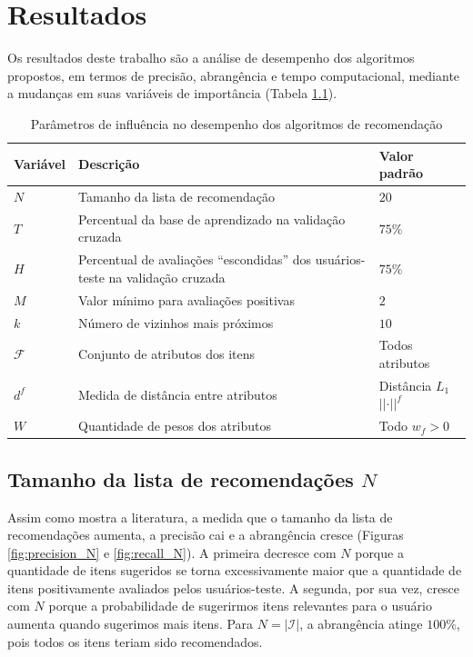\chapter[Resultados]{Resultados}
\label{chap:resultados}

Os resultados deste trabalho são a análise de desempenho dos algoritmos propostos, em termos de precisão, abrangência e tempo computacional, mediante a mudanças em suas variáveis de importância (Tabela \ref{tab:variaveis}).

\begin{table}[hp]
\begin{center}
    \caption{Parâmetros de influência no desempenho dos algoritmos de recomendação}
    \label{tab:variaveis}
    \begin{tabular}{  | p{2cm} | p{7cm} | p{3.5cm} | } 
    \hline
    \textbf{Variável} & \textbf{Descrição} & \textbf{Valor padrão}  \\ \hline
    $N$ & Tamanho da lista de recomendação & $20$ \\ \hline   
    $T$ & Percentual da base de aprendizado na validação cruzada & $75\%$ \\ \hline
    $H$ & Percentual de avaliações ``escondidas'' dos usuários-teste na validação cruzada & $75\%$ \\ \hline
    $M$ & Valor mínimo para avaliações positivas & $2$ \\ \hline
    $k$ & Número de vizinhos mais próximos & $10$ \\ \hline
    $\mathcal{F}$ & Conjunto de atributos dos itens & Todos atributos \\ \hline
    $d^f$ & Medida de distância entre atributos & Distância $L_1$~$\left|\left|\cdot\right|\right|^f$ \\ \hline
    $W$ & Quantidade de pesos dos atributos & Todo $w_f>0$ \\ \hline
    \end{tabular}
\end{center}
\end{table}

\section{Tamanho da lista de recomendações $N$} %
\label{sec:tamanho_da_lista_de_recomenda_es_}

Assim como mostra a literatura, a medida que o tamanho da lista de recomendações aumenta, a precisão cai e a abrangência cresce (Figuras \ref{fig:precision_N} e \ref{fig:recall_N}). A primeira decresce com $N$ porque a quantidade de itens sugeridos se torna excessivamente maior que a quantidade de itens positivamente avaliados pelos usuários-teste. A segunda, por sua vez, cresce com $N$ porque a probabilidade de sugerirmos itens relevantes para o usuário aumenta quando sugerimos mais itens. Para $N=\left|\mathcal{I}\right|$, a abrangência atinge $100\%$, pois todos os itens teriam sido recomendados.

